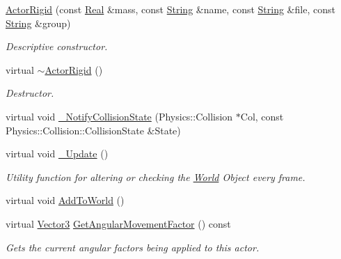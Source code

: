 \begin{DoxyCompactItemize}
\item 
\hyperlink{classMezzanine_1_1ActorRigid_a357f7dd2838696a73ed875cdd39e85df}{Actor\-Rigid} (const \hyperlink{namespaceMezzanine_a726731b1a7df72bf3583e4a97282c6f6}{Real} \&mass, const \hyperlink{namespaceMezzanine_acf9fcc130e6ebf08e3d8491aebcf1c86}{String} \&name, const \hyperlink{namespaceMezzanine_acf9fcc130e6ebf08e3d8491aebcf1c86}{String} \&file, const \hyperlink{namespaceMezzanine_acf9fcc130e6ebf08e3d8491aebcf1c86}{String} \&group)
\begin{DoxyCompactList}\small\item\em Descriptive constructor. \end{DoxyCompactList}\item 
virtual \hyperlink{classMezzanine_1_1ActorRigid_a8898e2d624ca89e3bc27dadfbc78560b}{$\sim$\-Actor\-Rigid} ()
\begin{DoxyCompactList}\small\item\em Destructor. \end{DoxyCompactList}\item 
virtual void \hyperlink{classMezzanine_1_1ActorRigid_a0290af701cc57b7bf2d8085e04841faf}{\-\_\-\-Notify\-Collision\-State} (Physics\-::\-Collision $\ast$Col, const Physics\-::\-Collision\-::\-Collision\-State \&State)
\begin{DoxyCompactList}\small\item\em \end{DoxyCompactList}\item 
virtual void \hyperlink{classMezzanine_1_1ActorRigid_a714d836a18ddb4de65bec5afdfdbb81c}{\-\_\-\-Update} ()
\begin{DoxyCompactList}\small\item\em Utility function for altering or checking the \hyperlink{classMezzanine_1_1World}{World} Object every frame.  \end{DoxyCompactList}\item 
virtual void \hyperlink{classMezzanine_1_1ActorRigid_a5934a8751b9ec19dd2cd9327ce651d59}{Add\-To\-World} ()
\begin{DoxyCompactList}\small\item\em \end{DoxyCompactList}\item 
virtual \hyperlink{classMezzanine_1_1Vector3}{Vector3} \hyperlink{classMezzanine_1_1ActorRigid_ac2b338b867bfd7d2e322a834e308a957}{Get\-Angular\-Movement\-Factor} () const 
\begin{DoxyCompactList}\small\item\em Gets the current angular factors being applied to this actor. \end{DoxyCompactList}\item 

\end{DoxyCompactItemize}
